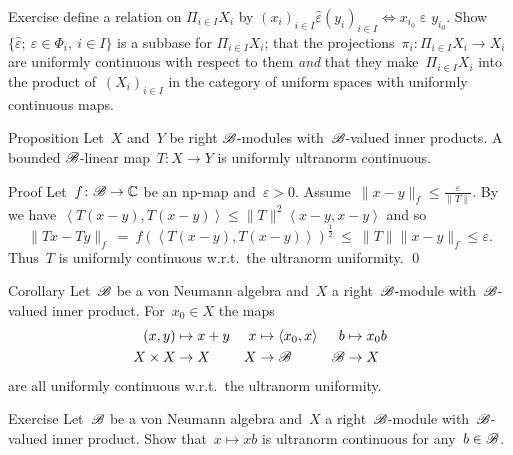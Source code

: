 \documentclass[b]{subfiles}
\begin{document}
\begin{parsec}
\begin{point}{Exercise}
    define a relation on
    $\Pi_{i \in I} X_i$ by
    $(x_i)_{i \in I} \mathrel{\hat\varepsilon} (y_i)_{i \in I}
    \iff x_{i_0} \mathrel\varepsilon y_{i_0}$.
    Show~$\{ \hat\varepsilon;\ \varepsilon \in \Phi_i, \ i\in I \}$
    is a subbase for $\Pi_{i \in I} X_i$;
    that the projections~$\pi_i \colon \Pi_{i \in I} X_i \to X_i$
    are uniformly continuous with respect to them
    \emph{and} that they make~$\Pi_{i \in I} X_i$
    into the product of~$(X_i)_{i \in I}$
    in the category of uniform spaces with uniformly continuous maps.
\end{point}
\end{parsec}

\begin{parsec}%
\begin{point}{Proposition}%
Let~$X$ and~$Y$ be right $\mathscr{B}$-modules
    with~$\mathscr{B}$-valued inner products.
A bounded $\mathscr{B}$-linear map~$T\colon X \to Y$
    is uniformly ultranorm continuous.
\begin{point}{Proof}%
Let~$f\colon \mathscr{B} \to \mathbb{C}$ be an np-map
    and~$\varepsilon > 0$.
Assume~$\|x-y\|_f \leq \frac{\varepsilon}{\|T\|}$.
By 
we have~$\left<T(x-y), T(x-y)\right> \leq \|T\|^2\left<x-y,x-y\right>$
and so
\begin{equation*}
    \|Tx - Ty\|_f \  =\  f(\left<T(x-y),T(x-y)\right>)^{\frac{1}{2}}
\ \leq\  \|T\| \|x-y\|_f \leq \varepsilon.
\end{equation*}
Thus~$T$ is uniformly continuous w.r.t.~the ultranorm uniformity. \qed
\end{point}
\end{point}
\begin{point}[ultranormcontstruct]{Corollary}%
Let~$\mathscr{B}$ be a von Neumann algebra
    and~$X$ a right~$\mathscr{B}$-module
    with~$\mathscr{B}$-valued inner product.
For~$x_0 \in X$ the maps
\begin{align*}
    (x,y) &\mapsto x+y & x &\mapsto \left<x_0, x\right>
    & b &\mapsto x_0 b \\
    X\times X &\to X & X &\to \mathscr{B} & \mathscr{B} & \to X
\end{align*}
are all uniformly continuous w.r.t.~the ultranorm uniformity.
\end{point}
\begin{point}[ultranormscalar]{Exercise}%
Let~$\mathscr{B}$ be a von Neumann algebra and~$X$ a right~$\mathscr{B}$-module
    with~$\mathscr{B}$-valued inner product.
Show that~$x \mapsto xb$
    is ultranorm continuous for any~$b \in \mathscr{B}$.
\end{point}

\end{parsec}
\end{document}
